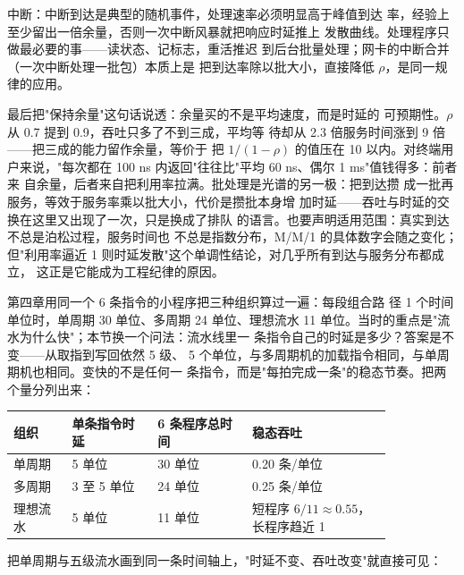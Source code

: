 中断：中断到达是典型的随机事件，处理速率必须明显高于峰值到达
率，经验上至少留出一倍余量，否则一次中断风暴就把响应时延推上
发散曲线。处理程序只做最必要的事——读状态、记标志，重活推迟
到后台批量处理；网卡的中断合并（一次中断处理一批包）本质上是
把到达率除以批大小，直接降低 $\rho$，是同一规律的应用。

最后把"保持余量"这句话说透：余量买的不是平均速度，而是时延的
可预期性。$\rho$ 从 0.7 提到 0.9，吞吐只多了不到三成，平均等
待却从 2.3 倍服务时间涨到 9 倍——把三成的能力留作余量，等价于
把 $1/(1-\rho)$ 的值压在 10 以内。对终端用户来说，"每次都在
100 ns 内返回"往往比"平均 60 ns、偶尔 1 ms"值钱得多：前者来
自余量，后者来自把利用率拉满。批处理是光谱的另一极：把到达攒
成一批再服务，等效于服务率乘以批大小，代价是攒批本身增
加时延——吞吐与时延的交换在这里又出现了一次，只是换成了排队
的语言。也要声明适用范围：真实到达不总是泊松过程，服务时间也
不总是指数分布，M/M/1 的具体数字会随之变化；但"利用率逼近 1
则时延发散"这个单调性结论，对几乎所有到达与服务分布都成立，
这正是它能成为工程纪律的原因。

第四章用同一个 6 条指令的小程序把三种组织算过一遍：每段组合路
径 1 个时间单位时，单周期 30 单位、多周期 24 单位、理想流水 11
单位。当时的重点是"流水为什么快"；本节换一个问法：流水线里一
条指令自己的时延是多少？答案是不变——从取指到写回依然 5 级、
5 个单位，与多周期机的加载指令相同，与单周期机也相同。变快的不是任何一
条指令，而是"每拍完成一条"的稳态节奏。把两个量分列出来：

\begin{longtable}{L{0.13\linewidth}L{0.19\linewidth}L{0.21\linewidth}L{0.31\linewidth}}
\toprule
组织 & 单条指令时延 & 6 条程序总时间 & 稳态吞吐 \\
\midrule
单周期 & 5 单位 & 30 单位 & 0.20 条/单位 \\
多周期 & 3 至 5 单位 & 24 单位 & 0.25 条/单位 \\
理想流水 & 5 单位 & 11 单位 & 短程序 $6/11\approx0.55$，长程序趋近 1 \\
\bottomrule
\end{longtable}

把单周期与五级流水画到同一条时间轴上，"时延不变、吞吐改变"就直接可见：

